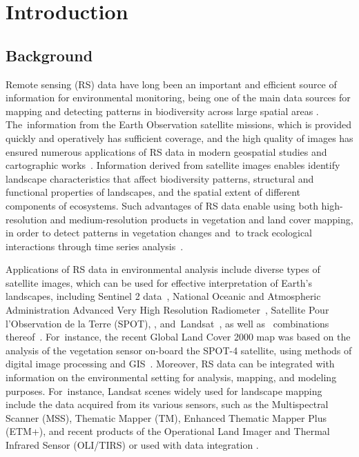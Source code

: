 \documentclass[coasts,article,accept,pdftex,oneauthor]{Definitions/mdpi}
\begin{document}
\section{Introduction}

\subsection{Background}
Remote sensing (RS) data have long been an important and efficient source of information for environmental monitoring, {being one of the main data sources for mapping and detecting patterns in biodiversity across large spatial areas} \cite{FAGAN2024432}. The~information from the Earth Observation satellite missions, which is provided quickly and operatively has sufficient coverage, and the high quality of images has ensured numerous applications of RS data in modern geospatial studies and cartographic works~\cite{LOEB2023}. {Information derived from satellite images enables identify landscape characteristics that affect biodiversity patterns, structural and functional properties of landscapes, and the spatial extent of different components of ecosystems. Such advantages of RS data enable using }both high-resolution and medium-resolution {products} in vegetation and land cover mapping, in order to detect patterns in vegetation changes and~to track ecological interactions through time series analysis~\cite{6352393,info14040249,Lemenkova202324}. 

{Applications of RS data in environmental analysis include diverse} types of satellite images, {which can be used }for effective interpretation of Earth's landscapes, {including} Sentinel 2 data~\cite{ZHAO2024169152,Lemenkova202021,CHOUDHARY20222443}, National Oceanic and Atmospheric Administration Advanced Very High Resolution Radiometer~\cite{JI2017215,ZHAN2022112836}, Satellite Pour l'Observation de la Terre (SPOT), \cite{FENSHOLT20091886}, and~Landsat~\cite{CHEN2023e19654,Lemenkova202323,LEMESIOS2024101153,SENAY2022113011,Lemenkova202321}, as well as~ combinations thereof~\cite{XIE2023,RADELOFF2024113918}. For~instance, the recent Global Land Cover 2000 map was based on the analysis of the vegetation sensor on-board the SPOT-4 satellite, using methods of digital image processing and GIS~\cite{GIRI2005123,WANG2023311}. {Moreover, RS data can be integrated with information on the environmental setting for analysis, mapping, and modeling purposes. For~instance, }Landsat scenes widely used for landscape mapping include the data acquired from {its }various{ }sensors, such as the Multispectral Scanner (MSS), Thematic Mapper (TM), Enhanced Thematic Mapper Plus (ETM+), and recent products of the Operational Land Imager and Thermal Infrared Sensor (OLI/TIRS) {or used with data integration }\cite{HE2018181,HUSSAIN2022103117,ESTOQUE2015205}.
\end{document}
